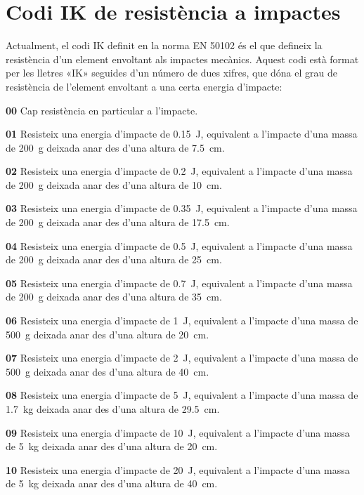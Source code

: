 \section{Codi IK de resistència a impactes}   

Actualment, el codi IK definit en la norma EN 50102 és el que defineix la resistència d'un element  envoltant als impactes mecànics. Aquest codi està format per les lletres «IK» seguides d'un número de dues xifres, que dóna el grau de resistència de l'element envoltant a una certa energia d'impacte:

\begin{list}{}
   {\setlength{\labelwidth}{10mm} \setlength{\leftmargin}{10mm} \setlength{\labelsep}{2mm}}
   \item[\textbf{00}] Cap resistència en particular a l'impacte.
   \item[\textbf{01}] Resisteix una energia d'impacte de \SI{0,15}{J}, equivalent a l'impacte d'una massa de \SI{200}{g} deixada anar des d'una altura de \SI{7,5}{cm}.
   \item[\textbf{02}] Resisteix una energia d'impacte de \SI{0,2}{J}, equivalent a l'impacte d'una massa de \SI{200}{g} deixada anar des d'una altura de \SI{10}{cm}.
   \item[\textbf{03}] Resisteix una energia d'impacte de \SI{0,35}{J}, equivalent a l'impacte d'una massa de \SI{200}{g} deixada anar des d'una altura de \SI{17,5}{cm}.
   \item[\textbf{04}] Resisteix una energia d'impacte de \SI{0,5}{J}, equivalent a l'impacte d'una massa de \SI{200}{g} deixada anar des d'una altura de \SI{25}{cm}.
   \item[\textbf{05}] Resisteix una energia d'impacte de \SI{0,7}{J}, equivalent a l'impacte d'una massa de \SI{200}{g} deixada anar des d'una altura de \SI{35}{cm}.
   \item[\textbf{06}]Resisteix una energia d'impacte de \SI{1}{J}, equivalent a l'impacte d'una massa de \SI{500}{g} deixada anar des d'una altura de \SI{20}{cm}.
   \item[\textbf{07}]Resisteix una energia d'impacte de \SI{2}{J}, equivalent a l'impacte d'una massa de \SI{500}{g} deixada anar des d'una altura de \SI{40}{cm}.
   \item[\textbf{08}]Resisteix una energia d'impacte de \SI{5}{J}, equivalent a l'impacte d'una massa de \SI{1,7}{kg} deixada anar des d'una altura de \SI{29,5}{cm}.
   \item[\textbf{09}]Resisteix una energia d'impacte de \SI{10}{J}, equivalent a l'impacte d'una massa de \SI{5}{kg} deixada anar des d'una altura de \SI{20}{cm}.
   \item[\textbf{10}]Resisteix una energia d'impacte de \SI{20}{J}, equivalent a l'impacte d'una massa de \SI{5}{kg} deixada anar des d'una altura de \SI{40}{cm}.
\end{list}



